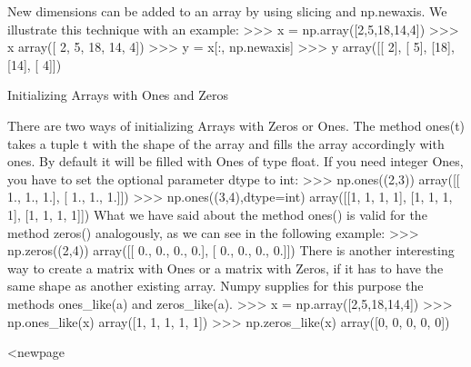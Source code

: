 New dimensions can be added to an array by using slicing and np.newaxis. We illustrate this technique with an example:
>>> x = np.array([2,5,18,14,4])
>>> x
array([ 2,  5, 18, 14,  4])
>>> y = x[:, np.newaxis]
>>> y
array([[ 2],
       [ 5],
       [18],
       [14],
       [ 4]])

Initializing Arrays with Ones and Zeros

There are two ways of initializing Arrays with Zeros or Ones. The method ones(t) takes a tuple t with the shape of the array and fills the array accordingly with ones. By default it will be filled with Ones of type float. If you need integer Ones, you have to set the optional parameter dtype to int:
>>> np.ones((2,3))
array([[ 1.,  1.,  1.],
       [ 1.,  1.,  1.]])
>>> np.ones((3,4),dtype=int)
array([[1, 1, 1, 1],
       [1, 1, 1, 1],
       [1, 1, 1, 1]])
What we have said about the method ones() is valid for the method zeros() analogously, as we can see in the following example:
>>> np.zeros((2,4))
array([[ 0.,  0.,  0.,  0.],
       [ 0.,  0.,  0.,  0.]])
There is another interesting way to create a matrix with Ones or a matrix with Zeros, if it has to have the same shape as another existing array. Numpy supplies for this purpose the methods ones_like(a) and zeros_like(a).
>>> x = np.array([2,5,18,14,4])
>>> np.ones_like(x)
array([1, 1, 1, 1, 1])
>>> np.zeros_like(x)
array([0, 0, 0, 0, 0])

<newpage



